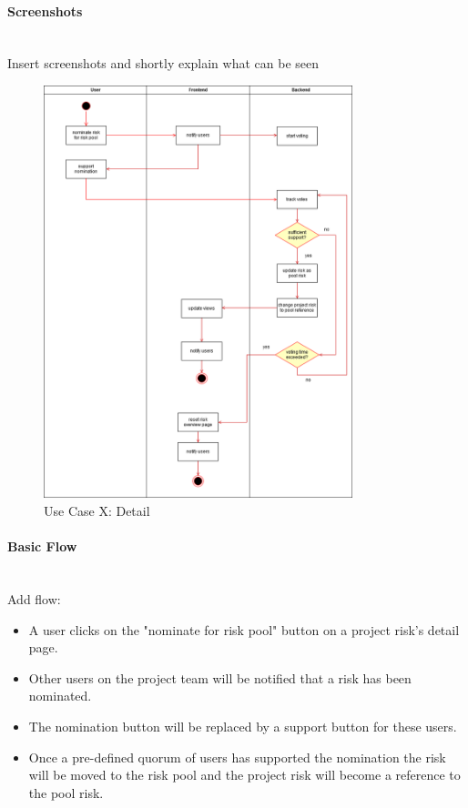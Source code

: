 \paragraph*{Screenshots}\mbox{}\\
Insert screenshots and shortly explain what can be seen
\begin{figure}[h] 
	\centering
	\includegraphics[width=0.8\textwidth]{Content/Domain/UC5RiskPoolDiagram.png}
	\caption{Use Case X: Detail}
	\label{fig:label5}
\end{figure}

\paragraph*{Basic Flow} \mbox{}\\
Add flow:
\begin{itemize}
	\vspace{-3mm}
	\setlength\itemsep{-1em}
	\item A user clicks on the "nominate for risk pool" button on a project risk's detail page.
	\item Other users on the project team will be notified that a risk has been nominated.
	\item The nomination button will be replaced by a support button for these users.
	\item Once a pre-defined quorum of users has supported the nomination the risk will be moved to the risk pool and the project risk will become a reference to the pool risk.
\end{itemize}


